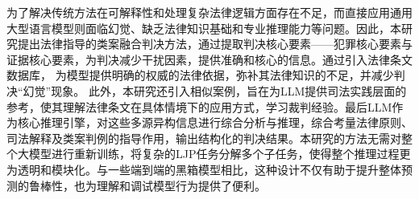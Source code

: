 为了解决传统方法在可解释性和处理复杂法律逻辑方面存在不足，而直接应用通用大型语言模型则面临幻觉、缺乏法律知识基础和专业推理能力等问题。因此，本研究提出法律指导的类案融合判决方法，通过提取判决核心要素——犯罪核心要素与证据核心要素，为判决减少干扰因素，提供准确和核心的信息。通过引入法律条文数据库， 为模型提供明确的权威的法律依据，弥补其法律知识的不足，并减少判决“幻觉”现象。 此外，本研究还引入相似案例，旨在为LLM提供司法实践层面的参考，使其理解法律条文在具体情境下的应用方式，学习裁判经验。最后LLM作为核心推理引擎，对这些多源异构信息进行综合分析与推理，综合考量法律原则、司法解释及类案判例的指导作用，输出结构化的判决结果。本研究的方法无需对整个大模型进行重新训练，将复杂的LJP任务分解多个子任务，使得整个推理过程更为透明和模块化。与一些端到端的黑箱模型相比，这种设计不仅有助于提升整体预测的鲁棒性，也为理解和调试模型行为提供了便利。

